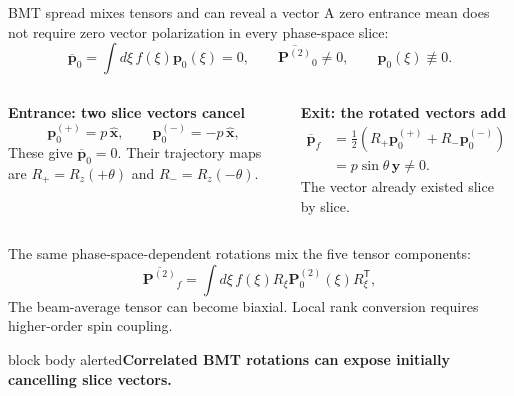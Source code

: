 \documentclass[aspectratio=169,11pt]{beamer}
\newcommand{\vct}[1]{\bm{#1}}
\newcommand{\Tens}{\bm P^{(2)}}
\newcommand{\conclusion}[1]{\begin{beamercolorbox}[rounded=true,sep=0.55em,wd=\textwidth]{block body alerted}\centering\bfseries\color{Navy}#1\end{beamercolorbox}}
\begin{document}
\begin{frame}{BMT spread mixes tensors and can reveal a vector}
  \small
  \setlength{\abovedisplayskip}{0.25em}
  \setlength{\belowdisplayskip}{0.25em}
  A zero entrance mean does not require zero vector polarization in every phase-space slice:
  \[
    \overline{\vct p}_0=\int d\xi\,f(\xi)\vct p_0(\xi)=0,
    \qquad
    \overline{\Tens}_0\neq0,
    \qquad
    \vct p_0(\xi)\not\equiv0.
  \]

  \begin{columns}[T,onlytextwidth]
      \textbf{Entrance: two slice vectors cancel}
      \[
        \vct p_0^{(+)}=p\,\hat{\vct x},
        \qquad
        \vct p_0^{(-)}=-p\,\hat{\vct x},
      \]
      These give $\overline{\vct p}_0=0$. Their trajectory maps are
      $R_+=R_z(+\theta)$ and $R_-=R_z(-\theta)$.

      \textbf{Exit: the rotated vectors add}
      \[
        \begin{aligned}
        \overline{\vct p}_f
          &=\tfrac12\left(R_+\vct p_0^{(+)}
                          +R_-\vct p_0^{(-)}\right)\\
          &=p\sin\theta\,\hat{\vct y}\neq0.
        \end{aligned}
      \]
      The vector already existed slice by slice.
  \end{columns}

  The same phase-space-dependent rotations mix the five tensor components:
  \[
    \overline{\Tens}_f
      =\int d\xi\,f(\xi)R_\xi\Tens_0(\xi)R_\xi^{\mathsf T},
  \]
  The beam-average tensor can become biaxial. Local rank conversion requires higher-order spin coupling.

  \vspace{0.05em}
  \conclusion{Correlated BMT rotations can expose initially cancelling slice vectors.}
\end{frame}
\end{document}
